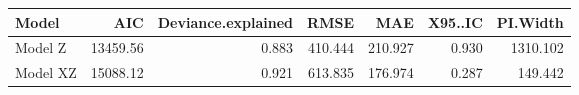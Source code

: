 \begin{table}[!h]
\centering
\begin{tabular}{lrrrrrr}
\toprule
Model & AIC & Deviance.explained & RMSE & MAE & X95..IC & PI.Width\\
\midrule
Model Z & 13459.56 & 0.883 & 410.444 & 210.927 & 0.930 & 1310.102\\
Model XZ & 15088.12 & 0.921 & 613.835 & 176.974 & 0.287 & 149.442\\
\bottomrule
\end{tabular}
\end{table}